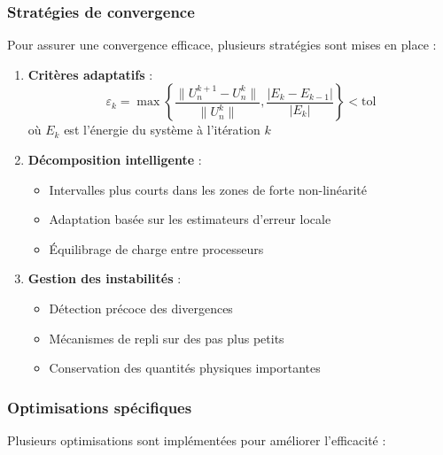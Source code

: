 \subsubsection{Stratégies de convergence}
Pour assurer une convergence efficace, plusieurs stratégies sont mises en place :

\begin{enumerate}
    \item \textbf{Critères adaptatifs} :
    \begin{equation}
    \varepsilon_k = \max\left\{\frac{\|U_n^{k+1} - U_n^k\|}{\|U_n^k\|}, \frac{|E_k - E_{k-1}|}{|E_k|}\right\} < \text{tol}
    \end{equation}
    où $E_k$ est l'énergie du système à l'itération $k$

    \item \textbf{Décomposition intelligente} :
    \begin{itemize}
        \item Intervalles plus courts dans les zones de forte non-linéarité
        \item Adaptation basée sur les estimateurs d'erreur locale
        \item Équilibrage de charge entre processeurs
    \end{itemize}

    \item \textbf{Gestion des instabilités} :
    \begin{itemize}
        \item Détection précoce des divergences
        \item Mécanismes de repli sur des pas plus petits
        \item Conservation des quantités physiques importantes
    \end{itemize}
\end{enumerate}

\subsubsection{Optimisations spécifiques}
Plusieurs optimisations sont implémentées pour améliorer l'efficacité :

